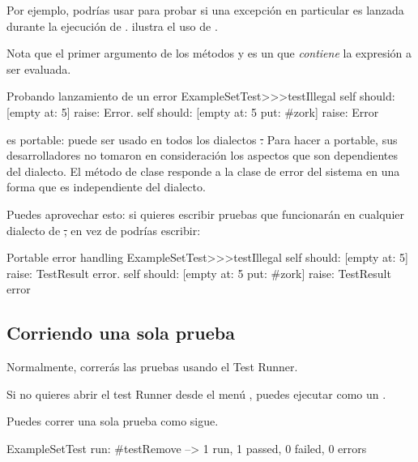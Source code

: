 \documentclass[a4paper,10pt,twoside]{book}
\begin{document}
Por ejemplo, podr\'ias usar 
para probar si una excepci\'on en particular es lanzada durante la
ejecuci\'on de .  ilustra el uso de \mbox{.}



Nota que el primer argumento de los m\'etodos  y  es un
 que \emph{contiene} la expresi\'on a ser evaluada.

\begin{method}[ESTtestIllegal]{Probando lanzamiento de un error}
ExampleSetTest>>>testIllegal
	self should: [empty at: 5] raise: Error.
	self should: [empty at: 5 put: #zork] raise: Error
\end{method}

\sunit es portable: puede ser usado en todos los dialectos \st.  Para hacer a \sunit portable,
sus desarrolladores no tomaron en consideraci\'on los aspectos que son dependientes
del dialecto. El m\'etodo de clase  responde a la clase
de error del sistema en una forma que es independiente del dialecto.

Puedes aprovechar esto: si quieres escribir pruebas que funcionar\'an en cualquier dialecto de \st, en vez de  podr\'ias escribir:

\begin{method}[portabletestillegal]{Portable error handling}
ExampleSetTest>>>testIllegal
	self should: [empty at: 5] raise: TestResult error.
	self should: [empty at: 5 put: #zork] raise: TestResult error
\end{method}


\subsection{Corriendo una sola prueba}
Normalmente, correr\'as las pruebas usando el Test Runner.

Si no quieres abrir el test Runner desde el men\'u ,
puedes ejecutar  como un .

Puedes correr una sola prueba como sigue.

\begin{code}{}
ExampleSetTest run: #testRemove --> 1 run, 1 passed, 0 failed, 0 errors
\end{code}
\end{document}
